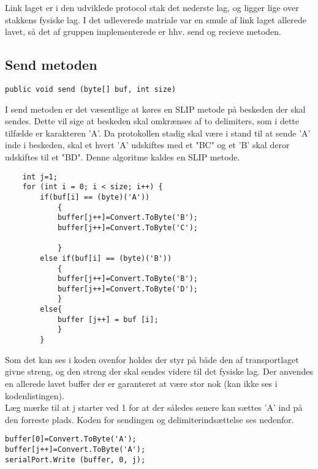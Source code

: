 Link laget er i den udviklede protocol stak det nederste lag, og ligger lige over stakkens fysiske lag. I det udleverede matriale var en smule af link laget allerede lavet, så det af gruppen implementerede er hhv. send og recieve metoden.

\subsection{Send metoden}

\begin{verbatim}
public void send (byte[] buf, int size)
\end{verbatim}

I send metoden er det væsentlige at køres en SLIP metode på beskeden der skal sendes. Dette vil sige at beskeden skal omkrænses af to delimiters, som i dette tilfælde er karakteren 'A'. Da protokollen stadig skal være i stand til at sende 'A' inde i beskeden, skal et hvert 'A' udskiftes med et "BC" og et 'B' skal deror udskiftes til et "BD". Denne algoritme kaldes en SLIP metode.


\begin{lstlisting}
	int j=1;
	for (int i = 0; i < size; i++) {
		if(buf[i] == (byte)('A'))
			{
			buffer[j++]=Convert.ToByte('B');
			buffer[j++]=Convert.ToByte('C');

			}
		else if(buf[i] == (byte)('B'))
			{
			buffer[j++]=Convert.ToByte('B');
			buffer[j++]=Convert.ToByte('D');
			}
		else{
			buffer [j++] = buf [i];
			}
		}
\end{lstlisting}

Som det kan ses i koden ovenfor holdes der styr på både den af transportlaget givne streng, og den streng der skal sendes videre til det fysiske lag. Der anvendes en allerede lavet buffer der er garanteret at være stor nok (kan ikke ses i kodenlistingen).\\

\noindent Læg mærke til at j starter ved 1 for at der således senere kan sættes 'A' ind på den forreste plads. Koden for sendingen og delimiterindsættelse ses nedenfor.

\begin{verbatim}
buffer[0]=Convert.ToByte('A');
buffer[j++]=Convert.ToByte('A');
serialPort.Write (buffer, 0, j);
\end{verbatim}

